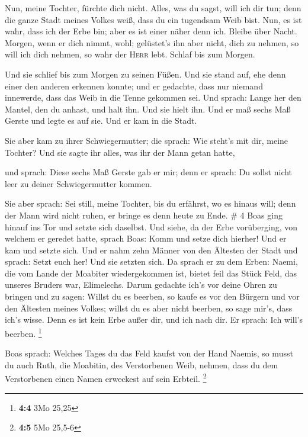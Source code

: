  Nun, meine Tochter, fürchte dich nicht. Alles, was du
sagst, will ich dir tun; denn die ganze Stadt meines Volkes weiß, dass
du ein tugendsam Weib bist.  Nun, es ist wahr, dass ich
der Erbe bin; aber es ist einer näher denn ich.  Bleibe
über Nacht. Morgen, wenn er dich nimmt, wohl; gelüstet's ihn aber nicht,
dich zu nehmen, so will ich dich nehmen, so wahr der \textsc{Herr} lebt.
Schlaf bis zum Morgen.

 Und sie schlief bis zum Morgen zu seinen Füßen. Und sie
stand auf, ehe denn einer den anderen erkennen konnte; und er gedachte,
dass nur niemand innewerde, dass das Weib in die Tenne gekommen sei.
 Und sprach: Lange her den Mantel, den du anhast, und
halt ihn. Und sie hielt ihn. Und er maß sechs Maß Gerste und legte es
auf sie. Und er kam in die Stadt.

 Sie aber kam zu ihrer Schwiegermutter; die sprach: Wie
steht's mit dir, meine Tochter? Und sie sagte ihr alles, was ihr der
Mann getan hatte,

 und sprach: Diese sechs Maß Gerste gab er mir; denn er
sprach: Du sollst nicht leer zu deiner Schwiegermutter kommen.

 Sie aber sprach: Sei still, meine Tochter, bis du
erfährst, wo es hinaus will; denn der Mann wird nicht ruhen, er bringe
es denn heute zu Ende. \# 4  Boas ging hinauf ins Tor und
setzte sich daselbst. Und siehe, da der Erbe vorüberging, von welchem er
geredet hatte, sprach Boas: Komm und setze dich hierher! Und er kam und
setzte sich.  Und er nahm zehn Männer von den Ältesten der
Stadt und sprach: Setzt euch her! Und sie setzten sich. 
Da sprach er zu dem Erben: Naemi, die vom Lande der Moabiter
wiedergekommen ist, bietet feil das Stück Feld, das unseres Bruders war,
Elimelechs.  Darum gedachte ich's vor deine Ohren zu
bringen und zu sagen: Willst du es beerben, so kaufe es vor den Bürgern
und vor den Ältesten meines Volkes; willst du es aber nicht beerben, so
sage mir's, dass ich's wisse. Denn es ist kein Erbe außer dir, und ich
nach dir. Er sprach: Ich will's beerben. \footnote{\textbf{4:4} 3Mo
  25,25}

 Boas sprach: Welches Tages du das Feld kaufst von der
Hand Naemis, so musst du auch Ruth, die Moabitin, des Verstorbenen Weib,
nehmen, dass du dem Verstorbenen einen Namen erweckest auf sein Erbteil.
\footnote{\textbf{4:5} 5Mo 25,5-6}

